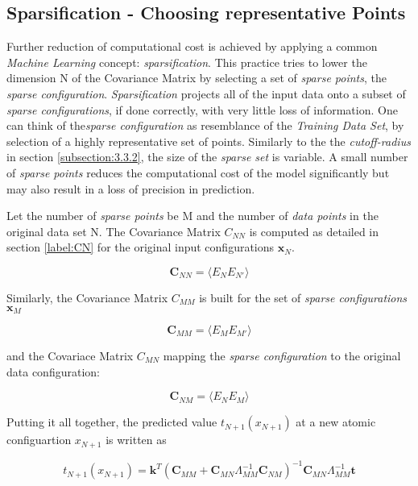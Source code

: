 \subsection{Sparsification - Choosing representative Points}
\label{3.3.3}
Further reduction of computational cost is achieved by applying a common \textit{Machine Learning} concept: \textit{sparsification}. This practice tries to lower the dimension N of the Covariance Matrix by selecting a set of \textit{sparse points}, the \textit{sparse configuration}.  \textit{Sparsification} projects all of the input data onto a subset of \textit{sparse configurations}, if done correctly, with very little loss of information. One can think of the\textit{sparse configuration}  as resemblance of the \textit{Training Data Set}, by selection of a highly representative set of points. Similarly to the the \textit{cutoff-radius} in section \ref{subsection:3.3.2}, the size of the \textit{sparse set} is variable. A small number of \textit{sparse points} reduces the computational cost of the model significantly but may also result in a loss of precision in prediction. 

Let the number of \textit{sparse points} be M and the number of \textit{data points} in the original data set N. 
The Covariance Matrix $C_{NN}$ is computed as detailed in section \ref{label:CN} for the original input configurations $\textbf{x}_N$. \cite[Appendix]{GAP-2009}


\begin{equation}
	\textbf{C}_{NN} = \langle E_N E_{N'} \rangle 
	\label{eq:CNN}
\end{equation}

Similarly,  the Covariance Matrix $C_{MM}$ is built for the set of \textit{sparse configurations} $\textbf{x}_M$ 

\begin{equation}
	\textbf{C}_{MM} = \langle E_M E_{M'} \rangle
	\label{eq:CMM}
\end{equation}

and the Covariace Matrix $C_{MN}$ mapping the \textit{sparse configuration} to the original data configuration:

\begin{equation}
	\textbf{C}_{NM} = \langle E_N E_{M} \rangle
	\label{eq:CMN}
\end{equation}

Putting it all together, the predicted value $t_{N+1}(x_{N+1})$ at a new atomic configuartion $x_{N+1}$ is written as

\begin{equation}
	 t_{N+1}(x_{N+1}) = \textbf{k}^T
(\textbf{C}_{MM} + \textbf{C}_{MN} \Lambda_{MM}^{-1}\textbf{C}_{NM})^{-1}
\textbf{C}_{MN}\Lambda_{MM}^{-1} \textbf{t}
	\label{eq:Final}
\end{equation}

